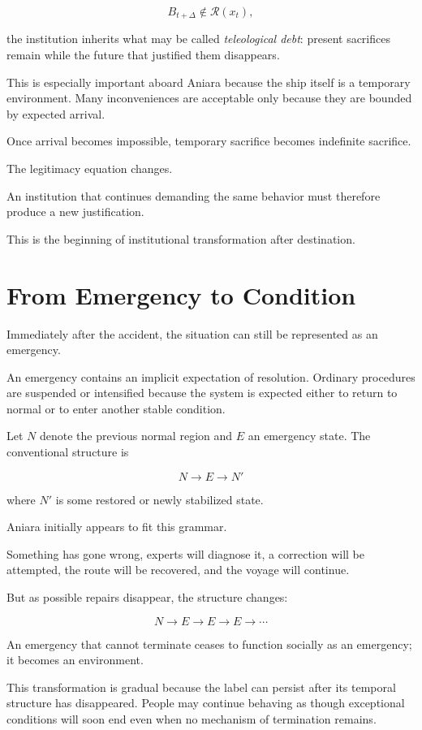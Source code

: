 \documentclass[11pt,oneside]{book}
\theoremstyle{definition}
\theoremstyle{remark}
\newcommand{\R}{\mathcal{R}}
\begin{document}
\[
B_{t+\Delta}\notin\R(x_t),
\]

the institution inherits what may be called \emph{teleological debt}: present sacrifices remain while the future that justified them disappears.

This is especially important aboard Aniara because the ship itself is a temporary environment. Many inconveniences are acceptable only because they are bounded by expected arrival.

Once arrival becomes impossible, temporary sacrifice becomes indefinite sacrifice.

The legitimacy equation changes.

An institution that continues demanding the same behavior must therefore produce a new justification.

This is the beginning of institutional transformation after destination.

\section{From Emergency to Condition}

Immediately after the accident, the situation can still be represented as an emergency.

An emergency contains an implicit expectation of resolution. Ordinary procedures are suspended or intensified because the system is expected either to return to normal or to enter another stable condition.

Let \(N\) denote the previous normal region and \(E\) an emergency state. The conventional structure is

\[
N
\rightarrow
E
\rightarrow
N'
\]

where \(N'\) is some restored or newly stabilized state.

Aniara initially appears to fit this grammar.

Something has gone wrong, experts will diagnose it, a correction will be attempted, the route will be recovered, and the voyage will continue.

But as possible repairs disappear, the structure changes:

\[
N
\rightarrow
E
\rightarrow
E
\rightarrow
E
\rightarrow\cdots
\]

An emergency that cannot terminate ceases to function socially as an emergency; it becomes an environment.

This transformation is gradual because the label can persist after its temporal structure has disappeared. People may continue behaving as though exceptional conditions will soon end even when no mechanism of termination remains.
\end{document}
